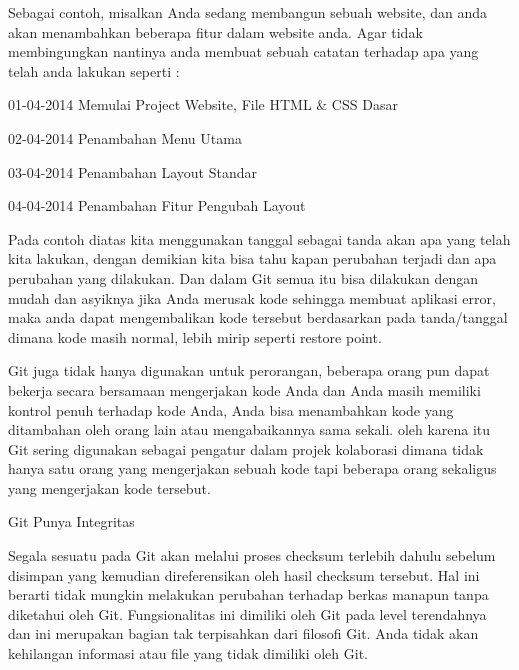 \noindent 
Sebagai contoh, misalkan Anda sedang membangun sebuah website, dan anda akan menambahkan beberapa fitur dalam website anda. Agar tidak membingungkan nantinya anda membuat sebuah catatan terhadap apa yang telah anda lakukan seperti : \par
\noindent 
 \hspace*{0.5in} 01-04-2014 Memulai Project Website, File HTML  $  \&  $ CSS Dasar \par
\noindent 
 \hspace*{0.5in} 02-04-2014 Penambahan Menu Utama \par
\noindent 
 \hspace*{0.5in} 03-04-2014 Penambahan Layout Standar \par
\noindent 
 \hspace*{0.5in} 04-04-2014 Penambahan Fitur Pengubah Layout \par
\noindent 
 \hspace*{0.5in} Pada contoh diatas kita menggunakan tanggal sebagai tanda akan apa yang telah kita lakukan, dengan demikian kita bisa tahu kapan perubahan terjadi dan apa perubahan yang dilakukan. Dan dalam Git semua itu bisa dilakukan dengan mudah dan asyiknya jika Anda merusak kode sehingga membuat aplikasi error, maka anda dapat mengembalikan kode tersebut berdasarkan pada tanda/tanggal dimana kode masih normal, lebih mirip seperti restore point. \par
\noindent 
 \hspace*{0.5in} Git juga tidak hanya digunakan untuk perorangan, beberapa orang pun dapat bekerja secara bersamaan mengerjakan kode Anda dan Anda masih memiliki kontrol penuh terhadap kode Anda, Anda bisa menambahkan kode yang ditambahan oleh orang lain atau mengabaikannya sama sekali. oleh karena itu Git sering digunakan sebagai pengatur dalam projek kolaborasi dimana tidak hanya satu orang yang mengerjakan sebuah kode tapi beberapa orang sekaligus yang mengerjakan kode tersebut. \par
\noindent 
 \hspace*{0.5in} Git Punya Integritas \par
\noindent 
Segala sesuatu pada Git akan melalui proses checksum terlebih dahulu sebelum disimpan yang kemudian direferensikan oleh hasil checksum tersebut. Hal ini berarti tidak mungkin melakukan perubahan terhadap berkas manapun tanpa diketahui oleh Git. Fungsionalitas ini dimiliki oleh Git pada level terendahnya dan ini merupakan bagian tak terpisahkan dari filosofi Git. Anda tidak akan kehilangan informasi atau file yang tidak dimiliki oleh Git. \par
